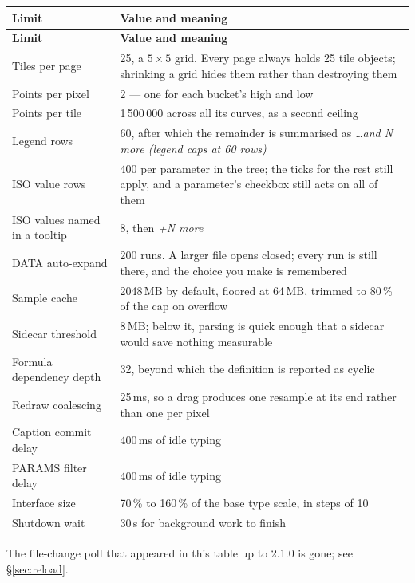 \documentclass[11pt,a4paper,oneside]{report}
\begin{document}
\begin{center}
\small
\begin{longtable}{@{}p{}p{}@{}}
\toprule
\textbf{Limit} & \textbf{Value and meaning} \\
\midrule
\endfirsthead
\toprule
\textbf{Limit} & \textbf{Value and meaning} \\
\midrule
\endhead
Tiles per page & 25, a $5 \times 5$ grid. Every page always holds 25 tile objects; shrinking a grid hides them rather than destroying them \\
Points per pixel & 2 --- one for each bucket's high and low \\
Points per tile & 1\,500\,000 across all its curves, as a second ceiling \\
Legend rows & 60, after which the remainder is summarised as \emph{\ldots and N more (legend caps at 60 rows)} \\
ISO value rows & 400 per parameter in the tree; the ticks for the rest still apply, and a parameter's checkbox still acts on all of them \\
ISO values named in a tooltip & 8, then \emph{+N more} \\
DATA auto-expand & 200 runs. A larger file opens closed; every run is still there, and the choice you make is remembered \\
Sample cache & 2048\,MB by default, floored at 64\,MB, trimmed to 80\,\% of the cap on overflow \\
Sidecar threshold & 8\,MB; below it, parsing is quick enough that a sidecar would save nothing measurable \\
Formula dependency depth & 32, beyond which the definition is reported as cyclic \\
Redraw coalescing & 25\,ms, so a drag produces one resample at its end rather than one per pixel \\
Caption commit delay & 400\,ms of idle typing \\
PARAMS filter delay & 400\,ms of idle typing \\
Interface size & 70\,\% to 160\,\% of the base type scale, in steps of 10 \\
Shutdown wait & 30\,s for background work to finish \\
\bottomrule
\end{longtable}
\end{center}

The file-change poll that appeared in this table up to 2.1.0 is gone; see
\S\ref{sec:reload}.
\end{document}
